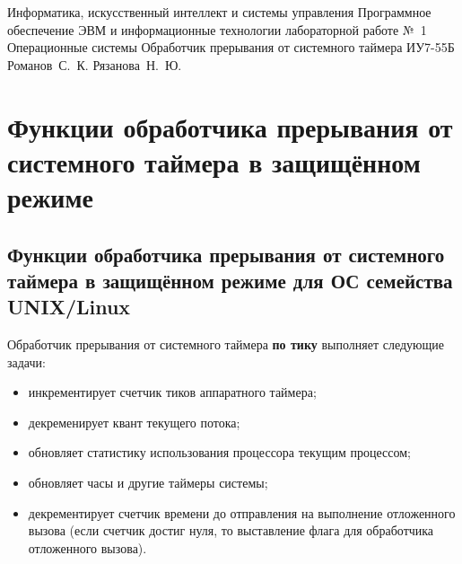 \documentclass[a4paper,12pt]{bmstu}
\begin{document}
\makereporttitle
    {Информатика, искусственный интеллект и системы управления} %
    {Программное обеспечение ЭВМ и информационные технологии} %
    {лабораторной работе №~1} %
    {Операционные системы} %
    {Обработчик прерывания от системного таймера} %
    {} %
    {ИУ7-55Б} %
    {Романов~С.~К.} %
    {Рязанова~Н.~Ю.} %
\clearpage

\tableofcontents

\chapter{Функции обработчика прерывания от системного таймера в защищённом режиме}

\section{Функции обработчика прерывания от системного таймера в защищённом режиме для ОС семейства UNIX/Linux}

Обработчик прерывания от системного таймера \textbf{по тику} выполняет следующие задачи:
\begin{itemize}
    \item инкрементирует счетчик тиков аппаратного таймера;
    \item декременирует квант текущего потока;
    \item обновляет статистику использования процессора текущим процессом;
    \item обновляет часы и другие таймеры системы;
    \item декрементирует счетчик времени до отправления на выполнение отложенного вызова (если счетчик достиг нуля, то выставление флага для обработчика отложенного вызова).
\end{itemize}
\end{document}
